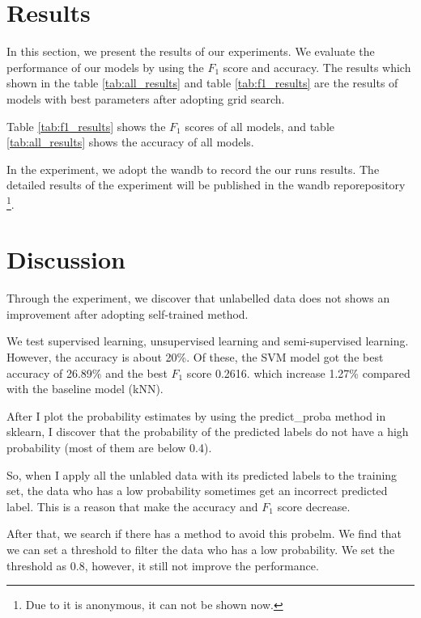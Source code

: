 \documentclass[11pt]{article}
\begin{document}
\section{Results}

In this section, we present the results of our experiments.
We evaluate the performance of our models by using the $F_1$ score and accuracy.
The results which shown in the table \ref{tab:all_results} and table \ref{tab:f1_results} are the results of models with best parameters after adopting grid search.

Table \ref{tab:f1_results} shows the $F_1$ scores of all models,
and table \ref{tab:all_results} shows the accuracy of all models.



In the experiment, we adopt the wandb to record the our runs results.
The detailed results of the experiment will be published in the wandb reporepository \footnote{Due to it is anonymous, it can not be shown now.}.




\section{Discussion}


Through the experiment, we discover that unlabelled data does not shows an improvement after adopting self-trained method.


We test supervised learning, unsupervised learning and semi-supervised learning. 
However, the accuracy is about 20\%.
Of these, the SVM model got the best accuracy of 26.89\% and the best $F_1$ score 0.2616.
which increase 1.27\% compared with the baseline model (kNN).


After I plot the probability estimates by using the predict\_proba method in sklearn,
I discover that the probability of the predicted labels do not have a high probability (most of them are below 0.4).

So, when I apply all the unlabled data with its predicted labels to the training set,
the data who has a low probability sometimes get an incorrect predicted label. 
This is a reason that make the accuracy and $F_1$ score decrease.

After that, we search if there has a method to avoid this probelm.
We find that we can set a threshold to filter the data who has a low probability. \cite{Self-trained-semi-supervised-learning}
We set the threshold as 0.8, however, it still not improve the performance.
\end{document}
